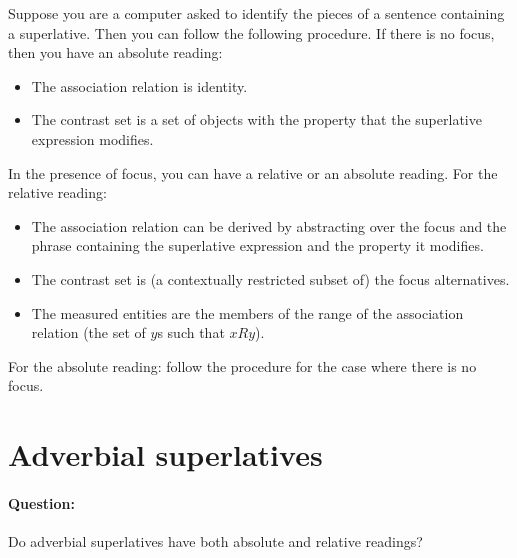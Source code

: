 \documentclass{article}
\begin{document}
Suppose you are a computer asked to identify the pieces of a sentence
containing a superlative. Then you can follow the following procedure.
If there is no focus, then you have an absolute reading:
\begin{itemize}
\item The association relation is identity.
\item The contrast set is a set of objects with the property that the
  superlative expression modifies.
\end{itemize}
In the presence of focus,  you can have a relative or an absolute
reading. For the relative reading:
\begin{itemize}
\item The association relation can be derived by
abstracting over the focus and the phrase containing the superlative
expression and the property it modifies.
\item The contrast set is (a contextually restricted
  subset of) the focus alternatives.
\item The measured entities are the members of the range of the
  association relation (the set of $y$s such that $xRy$).
\end{itemize}
For the absolute reading: follow the procedure for the case where
there is no focus.



           





\section{Adverbial superlatives}

\paragraph{Question:} Do adverbial superlatives have both absolute and relative readings?
\end{document}
